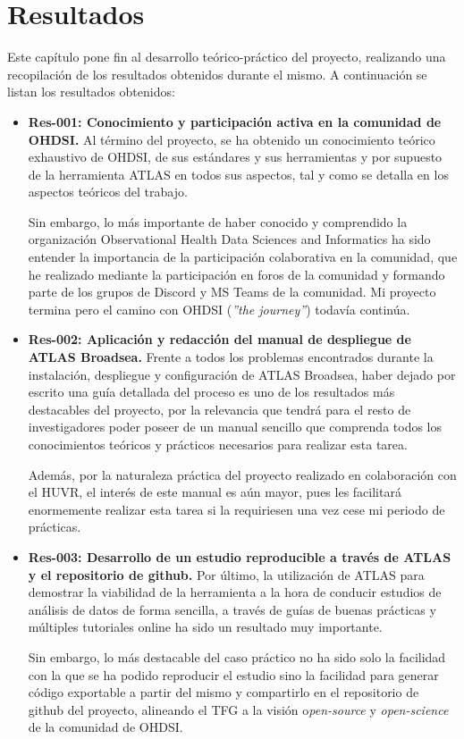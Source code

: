 \chapter{Resultados}\label{cap:10resultados}

Este capítulo pone fin al desarrollo teórico-práctico del proyecto, realizando una recopilación de los resultados obtenidos durante el mismo. A continuación se listan los resultados obtenidos:

\begin{itemize}

    \item \textbf{Res-001: Conocimiento y participación activa en la comunidad de OHDSI.} Al término del proyecto, se ha obtenido un conocimiento teórico exhaustivo de OHDSI, de sus estándares y sus herramientas y por supuesto de la herramienta ATLAS en todos sus aspectos, tal y como se detalla en los aspectos teóricos del trabajo.
    
    Sin embargo, lo más importante de haber conocido y comprendido la organización Observational Health Data Sciences and Informatics ha sido entender la importancia de la participación colaborativa en la comunidad, que he realizado mediante la participación en foros de la comunidad \cite{OHDSIforums} y formando parte de los grupos de Discord \cite{OHDSIdiscordInvitation} y MS Teams de la comunidad. Mi proyecto termina pero el camino con OHDSI (\textit{''the journey''}) todavía continúa.
    
    \item \textbf{Res-002: Aplicación y redacción del manual de despliegue de ATLAS Broadsea.} Frente a todos los problemas encontrados durante la instalación, despliegue y configuración de ATLAS Broadsea, haber dejado por escrito una guía detallada del proceso es uno de los resultados más destacables del proyecto, por la relevancia que tendrá para el resto de investigadores poder poseer de un manual sencillo que comprenda todos los conocimientos teóricos y prácticos necesarios para realizar esta tarea.

    Además, por la naturaleza práctica del proyecto realizado en colaboración con el HUVR, el interés de este manual es aún mayor, pues les facilitará enormemente realizar esta tarea si la requiriesen una vez cese mi periodo de prácticas. 

    \item \textbf{Res-003: Desarrollo de un estudio reproducible a través de ATLAS y el repositorio de github.} Por último, la utilización de ATLAS para demostrar la viabilidad de la herramienta a la hora de conducir estudios de análisis de datos de forma sencilla, a través de guías de buenas prácticas y múltiples tutoriales online ha sido un resultado muy importante. 

    Sin embargo, lo más destacable del caso práctico no ha sido solo la facilidad con la que se ha podido reproducir el estudio sino la facilidad para generar código exportable a partir del mismo y compartirlo en el repositorio de github del proyecto, alineando el TFG a la visión o\textit{pen-source} y \textit{open-science} de la comunidad de OHDSI. 

\end{itemize}

